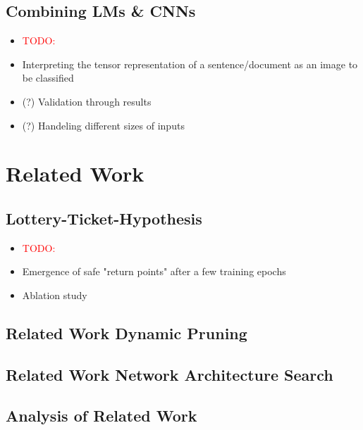 \section{Combining LMs \& CNNs}
\begin{itemize}
	\item \textcolor{red}{TODO:}
	\item Interpreting the tensor representation of a sentence/document as an image to be classified
	\item (?) Validation through results
	\item (?) Handeling different sizes of inputs
\end{itemize}


\chapter{Related Work}
\label{ch:relatedwork}
\section{Lottery-Ticket-Hypothesis}
\begin{itemize}
	\item \textcolor{red}{TODO:}
	\item Emergence of safe "return points" after a few training epochs
	\item Ablation study
\end{itemize}

\section{Related Work Dynamic Pruning}

\section{Related Work Network Architecture Search}

\section{Analysis of Related Work}


